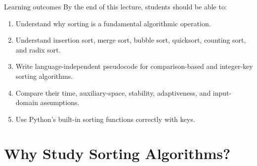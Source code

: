 \documentclass[aspectratio=169]{beamer}
\begin{document}
\begin{frame}{Learning outcomes}
  By the end of this lecture, students should be able to:
  \begin{enumerate}
    \item Understand why sorting is a fundamental algorithmic operation.
    \item Understand insertion sort, merge sort, bubble sort, quicksort, counting sort, and radix sort.
    \item Write language-independent pseudocode for comparison-based and integer-key sorting algorithms.
    \item Compare their time, auxiliary-space, stability, adaptiveness, and input-domain assumptions.
    \item Use Python's built-in sorting functions correctly with keys.
  \end{enumerate}
\end{frame}

\section{Why Study Sorting Algorithms?}
\end{document}
